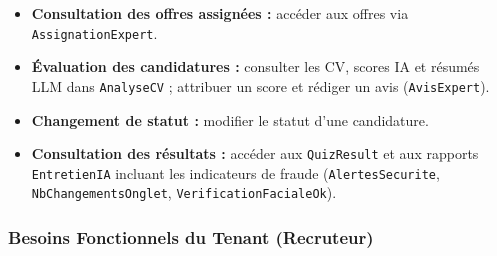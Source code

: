 \begin{itemize}
    \item \textbf{Consultation des offres assignées :} accéder aux offres via
    \texttt{AssignationExpert}.

    \item \textbf{Évaluation des candidatures :} consulter les CV, scores IA et
    résumés LLM dans \texttt{AnalyseCV} ; attribuer un score et rédiger un avis
    (\texttt{AvisExpert}).

    \item \textbf{Changement de statut :} modifier le statut d'une candidature.

    \item \textbf{Consultation des résultats :} accéder aux \texttt{QuizResult} et
    aux rapports \texttt{EntretienIA} incluant les indicateurs de fraude
    (\texttt{AlertesSecurite}, \texttt{NbChangementsOnglet}, \texttt{VerificationFacialeOk}).
\end{itemize}

\subsubsection{Besoins Fonctionnels du Tenant (Recruteur)}

